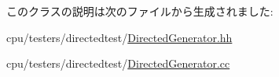 このクラスの説明は次のファイルから生成されました:\begin{DoxyCompactItemize}
\item 
cpu/testers/directedtest/\hyperlink{DirectedGenerator_8hh}{DirectedGenerator.hh}\item 
cpu/testers/directedtest/\hyperlink{DirectedGenerator_8cc}{DirectedGenerator.cc}\end{DoxyCompactItemize}
